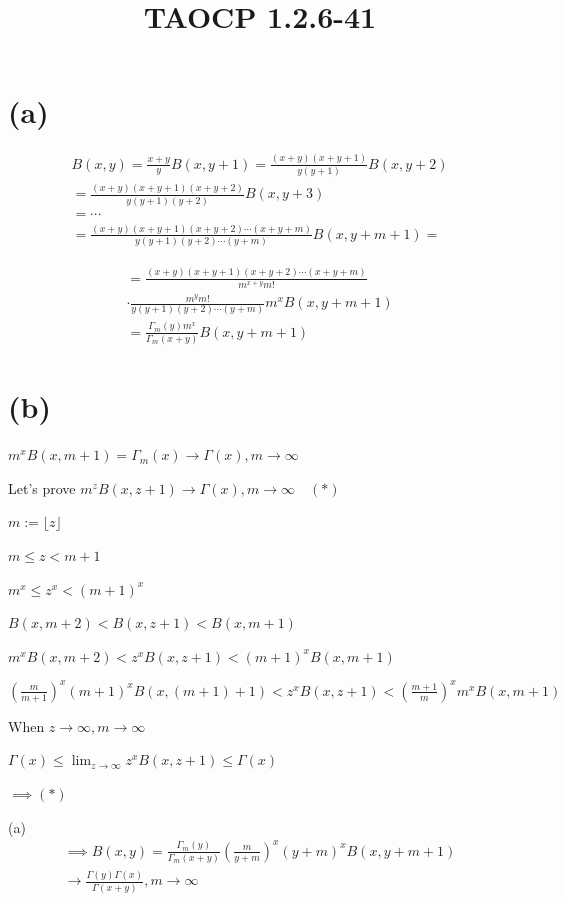 \documentclass{article}
\title{TAOCP 1.2.6\mbox{-}41}
\begin{document}
\maketitle

\section*{(a)}

\begin{multline*}
B(x,y) = \frac{x+y}{y} B(x, y+1) = \frac{(x+y)(x+y+1)}{y(y+1)} B(x, y + 2) \\
= \frac{(x+y)(x+y+1)(x+y+2)}{y(y+1)(y+2)} B(x, y + 3) \\
= \cdots \\
= \frac{(x+y)(x+y+1)(x+y+2)\cdots(x+y+m)}{y(y+1)(y+2)\cdots(y+m)} B(x, y + m + 1) =
\end{multline*}

\begin{multline*}
= \frac{(x+y)(x+y+1)(x+y+2)\cdots(x+y+m)}{m^{x+y}m!} \\
\cdot \frac{m^{y}m!}{y(y+1)(y+2)\cdots(y+m)} m^{x}B(x,y + m + 1) \\
= \frac{\Gamma_{m}(y)m^{x}}{\Gamma_{m}(x+y)} B(x,y + m + 1)
\end{multline*}

\section*{(b)}

\( m^{x} B(x, m + 1) = \Gamma_{m}(x) \to \Gamma(x), m \to \infty \)

Let's prove \( m^{z} B(x, z + 1) \to \Gamma(x), m \to \infty\quad (*) \)

\( m := \lfloor z \rfloor \)

\( m \leq z < m + 1 \)

\( m^{x} \leq z^{x} < {(m+1)}^{x} \)

\( B(x, m + 2) < B(x, z + 1) < B(x, m + 1) \)

\( m^{x} B(x, m + 2) < z^{x} B(x, z+ 1) < {(m+1)}^{x} B(x, m + 1) \)

\( {(\frac{m}{m+1})}^{x} {(m+1)}^{x} B(x, (m+1) + 1) < z^{x} B(x, z+ 1) < {(\frac{m+1}{m})}^{x} m^{x} B(x, m + 1) \)

When \( z \to \infty, m \to \infty \)

\( \Gamma(x) \leq \lim_{z \to \infty} z^{x} B(x, z+ 1) \leq \Gamma(x) \)

\( \implies (*) \)

(a)
\begin{multline*}
\implies B(x,y) = \frac{\Gamma_{m}(y)}{\Gamma_{m}(x+y)} {\left(\frac{m}{y+m}\right)}^{x} {(y+m)}^{x} B(x, y + m +1) \\
\to \frac{\Gamma(y)\Gamma(x)}{\Gamma(x+y)}, m \to \infty
\end{multline*}
\end{document}
